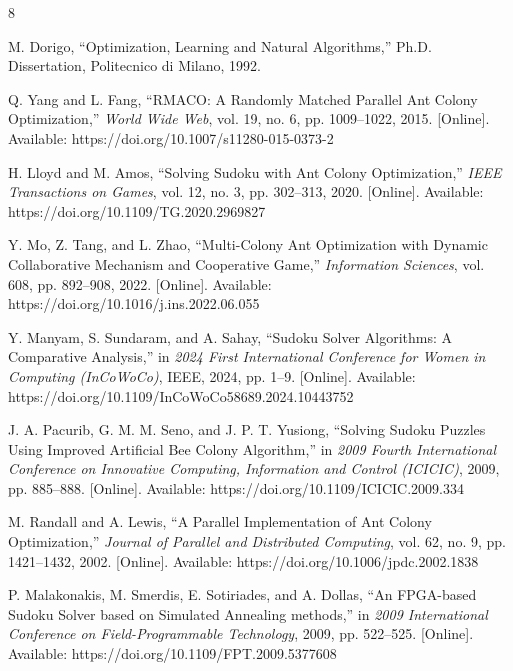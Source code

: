 \documentclass[runningheads]{llncs}
\begin{document}


%
%
%
% 
% 
%
\begin{thebibliography}{8}

    M. Dorigo, ``Optimization, Learning and Natural Algorithms,'' Ph.D. Dissertation, Politecnico di Milano, 1992.

    Q. Yang and L. Fang, ``RMACO: A Randomly Matched Parallel Ant Colony Optimization,'' \emph{World Wide Web}, vol. 19, no. 6, pp. 1009--1022, 2015. [Online]. Available: https://doi.org/10.1007/s11280-015-0373-2

    H. Lloyd and M. Amos, ``Solving Sudoku with Ant Colony Optimization,'' \emph{IEEE Transactions on Games}, vol. 12, no. 3, pp. 302--313, 2020. [Online]. Available: https://doi.org/10.1109/TG.2020.2969827

    Y. Mo, Z. Tang, and L. Zhao, ``Multi-Colony Ant Optimization with Dynamic Collaborative Mechanism and Cooperative Game,'' \emph{Information Sciences}, vol. 608, pp. 892--908, 2022. [Online]. Available: https://doi.org/10.1016/j.ins.2022.06.055

    Y. Manyam, S. Sundaram, and A. Sahay, ``Sudoku Solver Algorithms: A Comparative Analysis,'' in \emph{2024 First International Conference for Women in Computing (InCoWoCo)}, IEEE, 2024, pp. 1--9. [Online]. Available: https://doi.org/10.1109/InCoWoCo58689.2024.10443752

    J. A. Pacurib, G. M. M. Seno, and J. P. T. Yusiong, ``Solving Sudoku Puzzles Using Improved Artificial Bee Colony Algorithm,'' in \emph{2009 Fourth International Conference on Innovative Computing, Information and Control (ICICIC)}, 2009, pp. 885--888. [Online]. Available: https://doi.org/10.1109/ICICIC.2009.334

    M. Randall and A. Lewis, ``A Parallel Implementation of Ant Colony Optimization,'' \emph{Journal of Parallel and Distributed Computing}, vol. 62, no. 9, pp. 1421--1432, 2002. [Online]. Available: https://doi.org/10.1006/jpdc.2002.1838

    P. Malakonakis, M. Smerdis, E. Sotiriades, and A. Dollas, ``An FPGA-based Sudoku Solver based on Simulated Annealing methods,'' in \emph{2009 International Conference on Field-Programmable Technology}, 2009, pp. 522--525. [Online]. Available: https://doi.org/10.1109/FPT.2009.5377608


\end{thebibliography}
\end{document}
